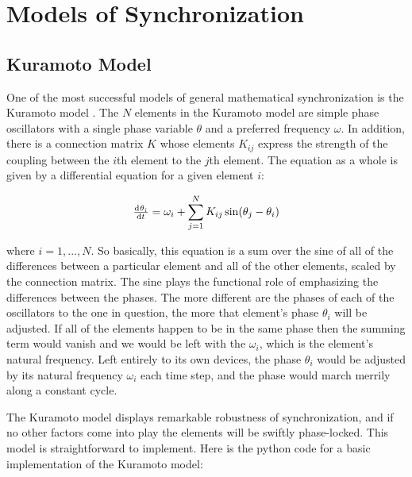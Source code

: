 \documentclass[12pt]{article}
\begin{document}
\section{Models of Synchronization}

\subsection{Kuramoto Model}

One of the most successful models of general mathematical synchronization is the Kuramoto model \cite{Acebrón} \cite{Ermentrout}.  The $N$ elements in the Kuramoto model are simple phase oscillators with a single phase variable $\theta$ and a preferred frequency $\omega$.  In addition, there is a connection matrix $K$ whose elements $K_{ij}$ express the strength of the coupling between the $i$th element to the $j$th element.  The equation as a whole is given by a differential equation for a given element $i$:

$$ \od{\theta_i}{t}=\omega_i+\sum\limits_{j=1}^N K_{ij}\sin(\theta_j-\theta_i)$$

where $i=1,...,N$.  So basically, this equation is a sum over the sine of all of the differences between a particular element and all of the other elements, scaled by the connection matrix.  The sine plays the functional role of emphasizing the differences between the phases.  The more different are the phases of each of the oscillators to the one in question, the more that element's phase $\theta_i$ will be adjusted.  If all of the elements happen to be in the same phase then the summing term would vanish and we would be left with the $\omega_i$, which is the element's natural frequency.  Left entirely to its own devices, the phase $\theta_i$ would be adjusted by its natural frequency $\omega_i$ each time step, and the phase would march merrily along a constant cycle.  

The Kuramoto model displays remarkable robustness of synchronization, and if no other factors come into play the elements will be swiftly phase-locked.  This model is straightforward to implement.  Here is the python code for a basic implementation of the Kuramoto model:
\end{document}
